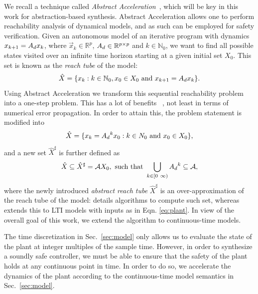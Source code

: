 We recall a technique called \emph{Abstract Acceleration}~\cite{JSS14,cattaruzza2015unbounded}, 
which will be key in this work for abstraction-based synthesis.  
Abstract Acceleration allows one to perform reachability analysis of dynamical models, 
and as such can be employed for safety verification. 
% 
Given an autonomous model of an iterative program with dynamics 
%
${x}_{k+1}={A_d}{x}_k$, 
where $\vec{x}_k \in \mathbb{R}^p$, ${A_d} \in \mathbb{R}^{p \times p}$ and $k \in \mathbb N_0$, 
%
we want to find all possible states visited over an infinite time horizon starting at a given initial set $X_0$.  
This set is known as the \emph{reach tube} of the model: 
%
\begin{equation}
\hat{X} = \{ {x}_k: k \in \mathbb N_0, {x}_0 \in X_0 \text{ and } {x}_{k+1}={A_d}{x}_k\}.
\end{equation}
%
Using Abstract Acceleration we transform this sequential reachability problem into a one-step problem. 
This has a lot of benefits ~\cite{JSS14}, not least in terms of numerical error propagation.   
In order to attain this, 
the problem statement is modified 
into 
%
\begin{equation}
\hat{X} = \{ {x}_k={A_d}^k{x}_0: k \in N_0 \text{ and } {x}_0 \in X_0 \}, 
\end{equation}
%
and a new 
set $\hat{X}^\sharp$ is further defined as 
%
\begin{equation}\label{eq:aa_reachtube}
\hat{X} \subseteq \hat{X}^\sharp = \mathcal{A}X_0, \text{ such that } \bigcup_{k \in [0\ \infty)} {A_d}^k \subseteq \mathcal{A}, 
\end{equation}
%
where the newly introduced \emph{abstract reach tube} $\hat{X}^\sharp$ is an
over-approximation of the reach tube of the model: 
\cite{JSS14} details algorithms to compute such set, 
whereas \cite{cattaruzza2015unbounded} extends this to LTI models with inputs as in Eqn. \eqref{eq:plant}.  
In view of the overall goal of this work, 
we extend the algorithm to continuous-time models.  


The time discretization in Sec.~\ref{sec:model} only allows us to evaluate
the state of the plant at integer multiples of the sample time.  
However, in order to synthesize a soundly safe controller, 
we must be able to ensure that the safety of the plant holds at any continuous point in time.  
In order to do so, we accelerate the dynamics of the plant according to the continuous-time model
semantics in Sec.~\ref{sec:model}. 

